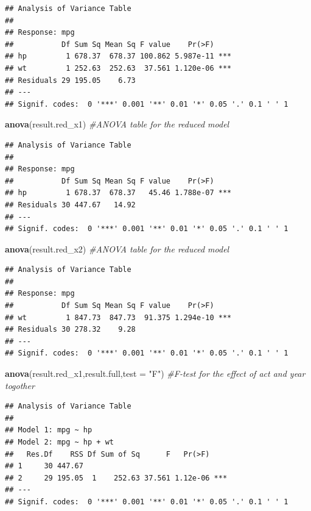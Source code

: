 \documentclass[
]{article}
\newenvironment{Shaded}{\begin{snugshade}}{\end{snugshade}}
\newcommand{\AttributeTok}[1]{\textcolor[rgb]{0.13,0.29,0.53}{#1}}
\newcommand{\CommentTok}[1]{\textcolor[rgb]{0.56,0.35,0.01}{\textit{#1}}}
\newcommand{\FunctionTok}[1]{\textcolor[rgb]{0.13,0.29,0.53}{\textbf{#1}}}
\newcommand{\NormalTok}[1]{#1}
\newcommand{\StringTok}[1]{\textcolor[rgb]{0.31,0.60,0.02}{#1}}
\begin{document}
\begin{verbatim}
## Analysis of Variance Table
## 
## Response: mpg
##           Df Sum Sq Mean Sq F value    Pr(>F)    
## hp         1 678.37  678.37 100.862 5.987e-11 ***
## wt         1 252.63  252.63  37.561 1.120e-06 ***
## Residuals 29 195.05    6.73                      
## ---
## Signif. codes:  0 '***' 0.001 '**' 0.01 '*' 0.05 '.' 0.1 ' ' 1
\end{verbatim}

\begin{Shaded}
\begin{Highlighting}[]
\FunctionTok{anova}\NormalTok{(result.red\_x1)        }\CommentTok{\#ANOVA table for the reduced model}
\end{Highlighting}
\end{Shaded}

\begin{verbatim}
## Analysis of Variance Table
## 
## Response: mpg
##           Df Sum Sq Mean Sq F value    Pr(>F)    
## hp         1 678.37  678.37   45.46 1.788e-07 ***
## Residuals 30 447.67   14.92                      
## ---
## Signif. codes:  0 '***' 0.001 '**' 0.01 '*' 0.05 '.' 0.1 ' ' 1
\end{verbatim}

\begin{Shaded}
\begin{Highlighting}[]
\FunctionTok{anova}\NormalTok{(result.red\_x2)        }\CommentTok{\#ANOVA table for the reduced model}
\end{Highlighting}
\end{Shaded}

\begin{verbatim}
## Analysis of Variance Table
## 
## Response: mpg
##           Df Sum Sq Mean Sq F value    Pr(>F)    
## wt         1 847.73  847.73  91.375 1.294e-10 ***
## Residuals 30 278.32    9.28                      
## ---
## Signif. codes:  0 '***' 0.001 '**' 0.01 '*' 0.05 '.' 0.1 ' ' 1
\end{verbatim}

\begin{Shaded}
\begin{Highlighting}[]
\FunctionTok{anova}\NormalTok{(result.red\_x1,result.full,}\AttributeTok{test =} \StringTok{"F"}\NormalTok{) }\CommentTok{\#F{-}test for the effect of act and year togother}
\end{Highlighting}
\end{Shaded}

\begin{verbatim}
## Analysis of Variance Table
## 
## Model 1: mpg ~ hp
## Model 2: mpg ~ hp + wt
##   Res.Df    RSS Df Sum of Sq      F   Pr(>F)    
## 1     30 447.67                                 
## 2     29 195.05  1    252.63 37.561 1.12e-06 ***
## ---
## Signif. codes:  0 '***' 0.001 '**' 0.01 '*' 0.05 '.' 0.1 ' ' 1
\end{verbatim}
\end{document}
